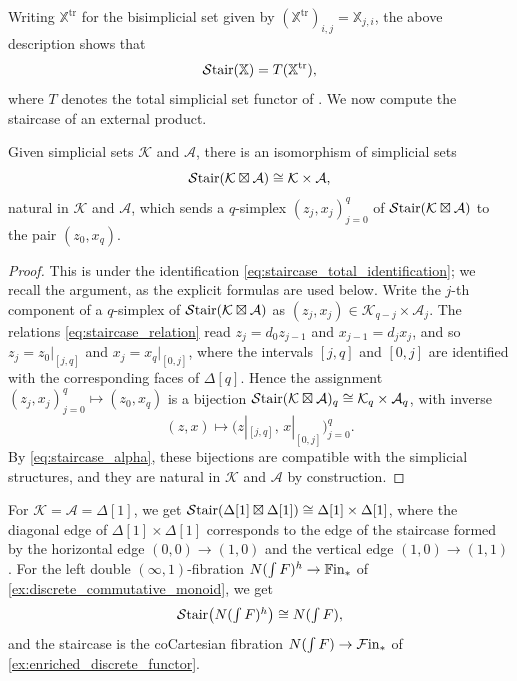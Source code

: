 \documentclass[10pt,reqno]{amsart}
\begin{document}
Writing $\mathbb X^{\mathrm{tr}}$ for the bisimplicial set given by
$(\mathbb X^{\mathrm{tr}})_{i,j}=\mathbb X_{j,i}$, the above
description shows that
\begin{equation}
\label{eq:staircase_total_identification}
\mathcal{S}\mathrm{tair}(\mathbb X)=T(\mathbb X^{\mathrm{tr}}),
\end{equation}
where $T$ denotes the total simplicial set functor of
\cite[Definition~3.1]{Stevenson2025TotalSimplicialSet}. We now compute
the staircase of an external product.

\begin{lemma}
\label{lem:staircase_external_product}
Given simplicial sets $\mathcal K$ and $\mathcal A$, there is an
isomorphism of simplicial sets
\begin{equation}
\label{eq:staircase_external_product}
\mathcal{S}\mathrm{tair}(\mathcal K\boxtimes \mathcal A)\cong \mathcal K\times \mathcal A,
\end{equation}
natural in $\mathcal K$ and $\mathcal A$, which sends a
$q$-simplex $(z_j,x_j)_{j=0}^q$ of
$\mathcal{S}\mathrm{tair}(\mathcal K\boxtimes\mathcal A)$ to the pair $(z_0,x_q)$.
\end{lemma}

\begin{proof}
This is \cite[Lemma~3.8]{Stevenson2025TotalSimplicialSet} under the
identification \eqref{eq:staircase_total_identification}; we recall
the argument, as the explicit formulas are used below. Write the
$j$-th component of a $q$-simplex of
$\mathcal{S}\mathrm{tair}(\mathcal K\boxtimes\mathcal A)$ as
$(z_j,x_j)\in\mathcal K_{q-j}\times\mathcal A_j$. The relations
\eqref{eq:staircase_relation} read $z_j=d_0z_{j-1}$ and
$x_{j-1}=d_jx_j$, and so $z_j=z_0|_{[j,q]}$ and
$x_j=x_q|_{[0,j]}$, where the intervals $[j,q]$ and $[0,j]$ are
identified with the corresponding faces of $\Delta[q]$. Hence the
assignment $(z_j,x_j)_{j=0}^q\mapsto(z_0,x_q)$ is a bijection
$\mathcal{S}\mathrm{tair}(\mathcal K\boxtimes\mathcal A)_q\cong
\mathcal K_q\times\mathcal A_q$, with inverse
\[
(z,x)\longmapsto\bigl(z|_{[j,q]},\,x|_{[0,j]}\bigr)_{j=0}^q.
\]
By \eqref{eq:staircase_alpha}, these bijections are compatible with
the simplicial structures, and they are natural in $\mathcal K$ and
$\mathcal A$ by construction.
\end{proof}

\begin{ex}
\label{ex:staircase_external_product}
For $\mathcal K=\mathcal A=\Delta[1]$, we get
$\mathcal{S}\mathrm{tair}(\Delta[1]\boxtimes\Delta[1])\cong\Delta[1]\times\Delta[1]$,
where the diagonal edge of $\Delta[1]\times\Delta[1]$ corresponds to
the edge of the staircase formed by the horizontal edge
$(0,0)\to(1,0)$ and the vertical edge $(1,0)\to(1,1)$. For the
left double $(\infty,1)$-fibration $N(\int F)^h\to\mathbb{F}\mathrm{in}_*$ of
\cref{ex:discrete_commutative_monoid}, we get
\[
 \mathcal{S}\mathrm{tair}\bigl(N(\textstyle\int F)^h\bigr)
 \cong N(\textstyle\int F),
\]
and the staircase is the coCartesian fibration
$N(\int F)\to\mathcal{F}\mathrm{in}_*$ of \cref{ex:enriched_discrete_functor}.
\end{ex}
\end{document}

